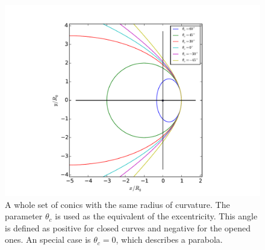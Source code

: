 \begin{figure}
\includegraphics[width=\linewidth]{conic1}
\caption{A whole set of conics with the same radius of curvature. The parameter $\theta_c$ is used as the equivalent of the excentricity. This angle is defined as positive for closed curves
and negative for the opened ones. An special case is $\theta_c=0$, which describes a parabola.}
\label{fig:conics-family}
\end{figure}

